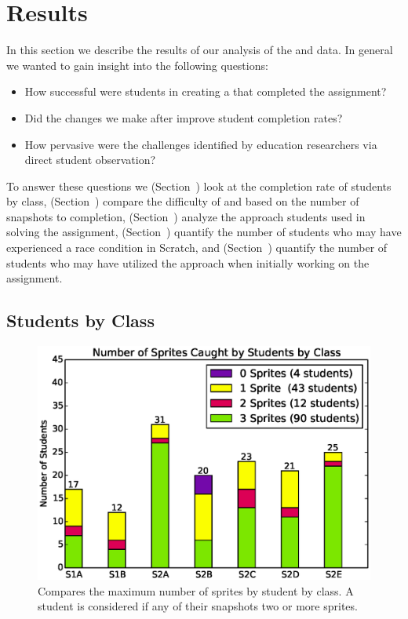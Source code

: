 \section{Results}
In this section we describe the results of our analysis of the \sone{} and
\stwo{} data. In general we wanted to gain insight into the following
questions:

\begin{itemize}
\item How successful were students in creating a \sprogram{} that completed the
  assignment?
\item Did the changes we make after \sone{} improve student completion rates?
\item How pervasive were the challenges identified by education researchers via
  direct student observation?
\end{itemize}

To answer these questions we (Section~) look at the
completion rate of students by class, (Section~)
compare the difficulty of \sone{} and \stwo{} based on the number of snapshots
to completion, (Section~) analyze the approach students
used in solving the assignment, (Section~) quantify the
number of students who may have experienced a race condition in Scratch, and
(Section~) quantify the number of students who may have
utilized the \dce{} approach when initially working on the assignment.


\subsection{Students by Class}

\begin{figure}[!t]
\centering
\includegraphics[width=5.25in]{graphs/by_class_students.eps}
\caption{Compares the maximum number of sprites \caught{} by student by
  class. A student is considered \com{} if any of their snapshots 
  two or more sprites.}
\end{figure}

